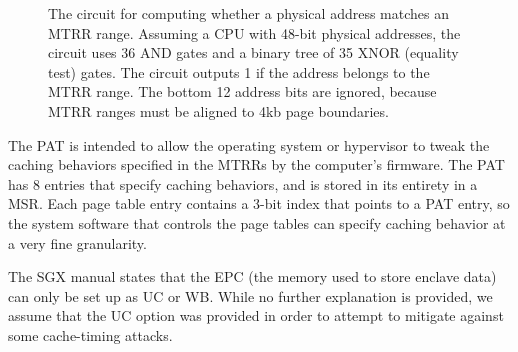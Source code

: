 \begin{figure}[hbt]
  \caption{
    The circuit for computing whether a physical address matches an MTRR range.
    Assuming a CPU with 48-bit physical addresses, the circuit uses 36 AND
    gates and a binary tree of 35 XNOR (equality test) gates. The circuit
    outputs 1 if the address belongs to the MTRR range. The bottom 12 address
    bits are ignored, because MTRR ranges must be aligned to 4kb page
    boundaries.
  }
  \label{fig:mtrr_match}
\end{figure}

The PAT is intended to allow the operating system or hypervisor to tweak the
caching behaviors specified in the MTRRs by the computer's firmware. The PAT
has 8 entries that specify caching behaviors, and is stored in its entirety in
a MSR. Each page table entry contains a 3-bit index that points to a PAT entry,
so the system software that controls the page tables can specify caching
behavior at a very fine granularity.

The SGX manual states that the EPC (the memory used to store enclave data) can
only be set up as UC or WB. While no further explanation is provided, we assume
that the UC option was provided in order to attempt to mitigate against some
cache-timing attacks.

